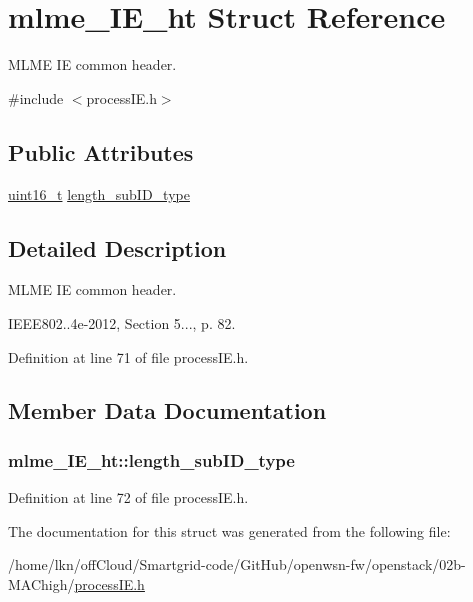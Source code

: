 \hypertarget{structmlme___i_e__ht}{}\section{mlme\+\_\+\+I\+E\+\_\+ht Struct Reference}
\label{structmlme___i_e__ht}


M\+L\+ME IE common header.  




{\ttfamily \#include $<$process\+I\+E.\+h$>$}

\subsection*{Public Attributes}
\begin{DoxyCompactItemize}
\item 
\hyperlink{_p_e___types_8h_a1f1825b69244eb3ad2c7165ddc99c956}{uint16\+\_\+t} \hyperlink{structmlme___i_e__ht_af174160bd1fb75092d5a52163f068acd}{length\+\_\+sub\+I\+D\+\_\+type}
\end{DoxyCompactItemize}


\subsection{Detailed Description}
M\+L\+ME IE common header. 

I\+E\+E\+E802..\+4e-\/2012, Section 5..., p. 82. 

Definition at line 71 of file process\+I\+E.\+h.



\subsection{Member Data Documentation}
\subsubsection[{\texorpdfstring{length\+\_\+sub\+I\+D\+\_\+type}{length_subID_type}}]{ mlme\+\_\+\+I\+E\+\_\+ht\+::length\+\_\+sub\+I\+D\+\_\+type}\hypertarget{structmlme___i_e__ht_af174160bd1fb75092d5a52163f068acd}{}\label{structmlme___i_e__ht_af174160bd1fb75092d5a52163f068acd}


Definition at line 72 of file process\+I\+E.\+h.



The documentation for this struct was generated from the following file\+:\begin{DoxyCompactItemize}
\item 
/home/lkn/off\+Cloud/\+Smartgrid-\/code/\+Git\+Hub/openwsn-\/fw/openstack/02b-\/\+M\+A\+Chigh/\hyperlink{process_i_e_8h}{process\+I\+E.\+h}\end{DoxyCompactItemize}
